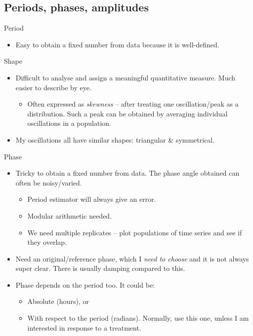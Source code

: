 \subsection{Periods, phases, amplitudes}
\label{subsec:analysis-characterisation-quantities}

Period
\begin{itemize}
\item Easy to obtain a fixed number from data because it is well-defined.
\end{itemize}

Shape
\begin{itemize}
\item Difficult to analyse and assign a meaningful quantitative measure.  Much easier to describe by eye.
\begin{itemize}
\item Often expressed as \emph{skewness} -- after treating one oscillation/peak as a distribution.  Such a peak can be obtained by averaging individual oscillations in a population.
\end{itemize}
\item My oscillations all have similar shapes: triangular \& symmetrical.
\end{itemize}


Phase
\begin{itemize}
\item Tricky to obtain a fixed number from data.  The phase angle obtained can often be noisy/varied.
\begin{itemize}
\item Period estimator will always give an error.
\item Modular arithmetic needed.
\item We need multiple replicates -- plot populations of time series and see if they overlap.
\end{itemize}
\item Need an original/reference phase, which I \emph{need to choose} and it is not always super clear.  There is usually damping compared to this.
\item Phase depends on the period too.  It could be:
\begin{itemize}
\item Absolute (hours), or
\item With respect to the period (radians).  Normally, use this one, unless I am interested in response to a treatment.
\end{itemize}
\end{itemize}


